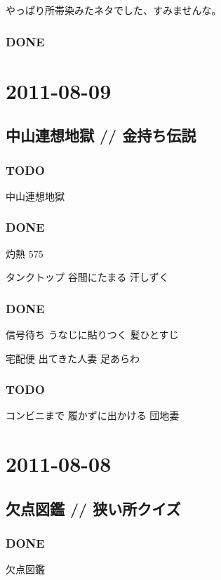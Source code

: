\documentclass[11pt]{article}
\begin{document}
やっぱり所帯染みたネタでした、すみませんな。
\subsubsection{\textbf{DONE}}
\label{sec-84_1_2}
\section{2011-08-09}
\label{sec-85}
\subsection{中山連想地獄 // 金持ち伝説}
\label{sec-85_1}
\subsubsection{\textbf{TODO}}
\label{sec-85_1_1}

中山連想地獄
\subsubsection{\textbf{DONE}}
\label{sec-85_1_2}

灼熱 575

タンクトップ 谷間にたまる 汗しずく
\subsubsection{\textbf{DONE}}
\label{sec-85_1_3}

信号待ち うなじに貼りつく 髪ひとすじ

宅配便 出てきた人妻 足あらわ
\subsubsection{\textbf{TODO}}
\label{sec-85_1_4}

コンビニまで 履かずに出かける 団地妻
\section{2011-08-08}
\label{sec-86}
\subsection{欠点図鑑 // 狭い所クイズ}
\label{sec-86_1}
\subsubsection{\textbf{DONE}}
\label{sec-86_1_1}

欠点図鑑
\end{document}
